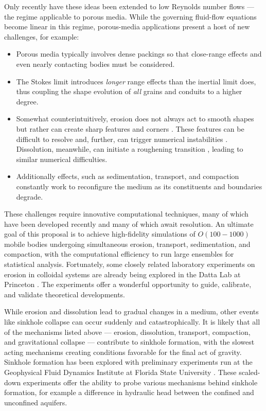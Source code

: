 \documentclass[11pt]{article}
\begin{document}
Only recently have these ideas been extended to low Reynolds number flows  \cite{mitchell2017generalized, Quaife2018} --- the regime applicable to porous media. While the governing fluid-flow equations become linear in this regime, porous-media applications present a host of new challenges, for example:
\begin{itemize}
\item Porous media typically involves dense packings so that close-range effects and even nearly contacting bodies must be considered.
\item The Stokes limit introduces {\em longer} range effects than the inertial limit does, thus coupling the shape evolution of {\em all} grains and conduits to a higher degree.
\item Somewhat counterintuitively, erosion does not always act to smooth shapes but rather can create sharp features and corners \cite{Ristroph2012}. These features can be difficult to resolve and, further, can trigger numerical instabilities \cite{Quaife2018}. Dissolution, meanwhile, can initiate a roughening transition \cite{claudin2017dissolution}, leading to similar numerical difficulties.
\item Additionally effects, such as sedimentation, transport, and compaction constantly work to reconfigure the medium as its constituents and boundaries degrade.
\end{itemize}
These challenges require innovative computational techniques, many of which have been developed recently \cite{Quaife2018} and many of which await resolution. An ultimate goal of this proposal is to achieve high-fidelity simulations of $O(100-1000)$ mobile bodies undergoing simultaneous erosion, transport, sedimentation, and compaction, with the computational efficiency to run large ensembles for statistical analysis.
Fortunately, some closely related laboratory experiments on erosion in colloidal systems are already being explored in the Datta Lab at Princeton \cite{bizmark2019multiscale}. The experiments offer a wonderful opportunity to guide, calibrate, and validate theoretical developments.

While erosion and dissolution lead to gradual changes in a medium, other events like sinkhole collapse can occur suddenly and catastrophically. It is likely that all of the mechanisms listed above --- erosion, dissolution, transport, compaction, and gravitational collapse --- contribute to sinkhole formation, with the slowest acting mechanisms creating conditions favorable for the final act of gravity. Sinkhole formation has been explored with preliminary experiments run at the Geophysical Fluid Dynamics Institute at Florida State University \cite{tao2014experimental}. These scaled-down experiments offer the ability to probe various mechanisms behind sinkhole formation, for example a difference in hydraulic head between the confined and unconfined aquifers. 
\end{document}
